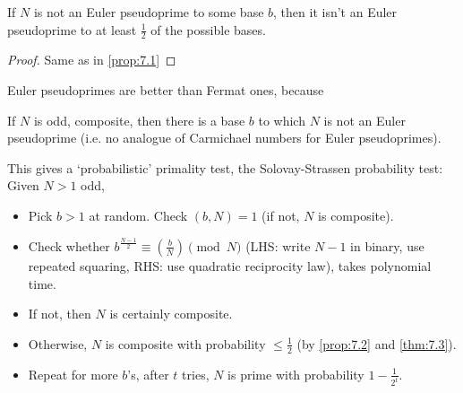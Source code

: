 \documentclass{article}
\newcommand{\legendre}[2]{\genfrac{(}{)}{}{}{#1}{#2}}
\begin{document}
\begin{nprop}\label{prop:7.2}
    If $N$ is not an Euler pseudoprime to some base $b$, then it isn't an Euler pseudoprime to at least $\frac{1}{2}$ of the possible bases.
\end{nprop}

\begin{proof}
    Same as in \cref{prop:7.1}
\end{proof}
Euler pseudoprimes are better than Fermat ones, because
\begin{nthm}\label{thm:7.3}
    If $N$ is odd, composite, then there is a base $b$ to which $N$ is not an Euler pseudoprime (i.e. no analogue of Carmichael numbers for Euler pseudoprimes).
\end{nthm}

This gives a `probabilistic' primality test, the Solovay-Strassen probability test:
Given $N>1$ odd,
\begin{itemize}
    \item Pick $b > 1$ at random. Check $(b, N) = 1$ (if not, $N$ is composite).
    \item Check whether $b^{\frac{N-1}{2}} \equiv \legendre{b}{N} \pmod{N}$
        (LHS: write $N-1$ in binary, use repeated squaring, RHS: use quadratic reciprocity law), takes polynomial time.
    \item If not, then $N$ is certainly composite.
    \item Otherwise, $N$ is composite with probability $\leq \frac{1}{2}$ (by \cref{prop:7.2} and \cref{thm:7.3}).
    \item Repeat for more $b$'s, after $t$ tries, $N$ is prime with probability $1 - \frac{1}{2^t}$.
\end{itemize}

\end{document}

